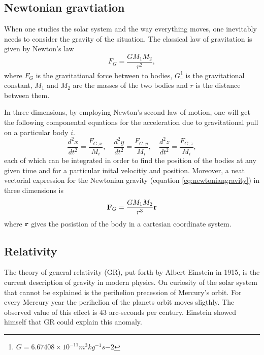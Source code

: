 \documentclass[10pt,a4paper]{amsart}
\begin{document}
\subsection{Newtonian gravtiation}
When one studies the solar system and the way everything moves, one inevitably needs to consider the gravity of the situation. The classical law of gravitation is given by Newton's law
\begin{equation}
\label{eq:newtoniangravity}
F_G = \frac{GM_1M_2}{r^2},
\end{equation} 
where $F_G$ is the gravitational force between to bodies, $G$\footnote{$G=6.67408 \times 10^{-11} m^3 kg^{-1} s{-2}$} is the gravitational constant, $M_1$ and $M_2$ are the masses of the two bodies and $r$ is the distance between them.

In three dimensions, by employing Newton's second law of motion, one will get the following componental equations for the acceleration due to gravitational pull on a particular body $i$.
\begin{equation}
\label{eq:componentalnewton}
\frac{d^2x}{dt^2} = \frac{F_{G,x}}{M_i}, \quad
\frac{d^2y}{dt^2} = \frac{F_{G,y}}{M_i}, \quad
\frac{d^2z}{dt^2} = \frac{F_{G,z}}{M_i},
\end{equation}
each of which can be integrated in order to find the position of the bodies at any given time and for a particular inital velocitiy and position. Moreover, a neat vectorial expression for the Newtonian gravity (equation \ref{eq:newtoniangravity}) in three dimensions is
\begin{equation}
\vb{F}_G = \frac{GM_1M_2}{r^3}\vb{r}
\end{equation}
where $\vb{r}$ gives the posistion of the body in a cartesian coordinate system.

\subsection{Relativity}

The theory of general relativity (GR), put forth by Albert Einstein in 1915, is the current description of gravity in modern physics. On curiosity of the solar system that cannot be explained is the perihelion precession of Mercury's orbit. For every Mercury year the perihelion of the planets orbit moves sligthly. The observed value of this effect is $43$ arc-seconds per century. Einstein showed himself that GR could explain this anomaly.
\end{document}
